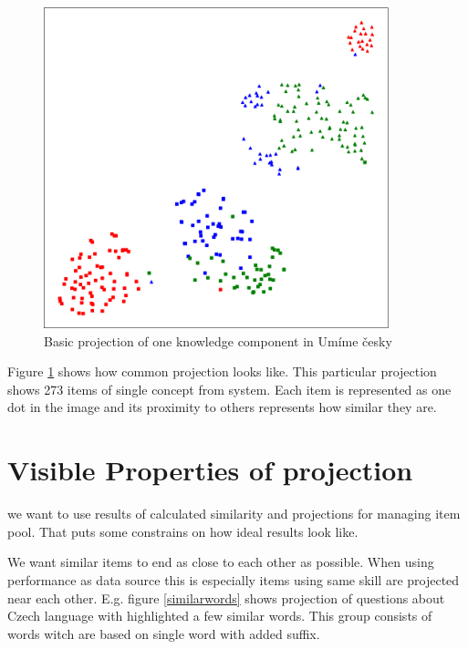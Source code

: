 \documentclass[
  digital, %
  table,   %
  nolof,     %
  nolot,     %
  nocover
]{fithesis3}
\begin{document}
\begin{figure}
  \begin{center}
    \includegraphics[width=10cm]{img/common_projection}
  \end{center}
  \caption{Basic projection of one knowledge component in Umíme česky}
  \label{fig:commonprojection}
\end{figure}

Figure \ref{fig:commonprojection} shows how common projection looks
like. This particular projection shows 273 items of single concept from
system. Each item is represented as one dot in the image and its
proximity to others represents how similar they are.

\section{Visible Properties of
projection}\label{visible-properties-of-projection}



we want to use results of calculated similarity and projections for
managing item pool. That puts some constrains on how ideal results look
like.

We want similar items to end as close to each other as possible. When
using performance as data source this is especially items using same
skill are projected near each other. E.g. figure \ref{similarwords}
shows projection of questions about Czech language with highlighted a
few similar words. This group consists of words witch are based on
single word with added suffix.
\end{document}
